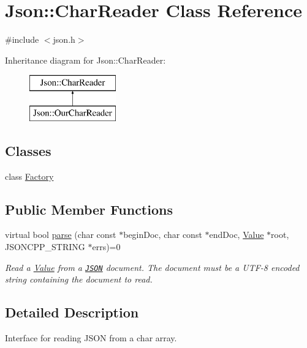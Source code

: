\hypertarget{classJson_1_1CharReader}{}\section{Json\+:\+:Char\+Reader Class Reference}
\label{classJson_1_1CharReader}


{\ttfamily \#include $<$json.\+h$>$}

Inheritance diagram for Json\+:\+:Char\+Reader\+:\begin{figure}[H]
\begin{center}
\leavevmode
\includegraphics[height=2.000000cm]{classJson_1_1CharReader}
\end{center}
\end{figure}
\subsection*{Classes}
\begin{DoxyCompactItemize}
\item 
class \hyperlink{classJson_1_1CharReader_1_1Factory}{Factory}
\end{DoxyCompactItemize}
\subsection*{Public Member Functions}
\begin{DoxyCompactItemize}
\item 
virtual bool \hyperlink{classJson_1_1CharReader_a7983680d50fd0745f371c43b162e78e1}{parse} (char const $\ast$begin\+Doc, char const $\ast$end\+Doc, \hyperlink{classJson_1_1Value}{Value} $\ast$root, J\+S\+O\+N\+C\+P\+P\+\_\+\+S\+T\+R\+I\+NG $\ast$errs)=0
\begin{DoxyCompactList}\small\item\em Read a \hyperlink{classJson_1_1Value}{Value} from a \href{http://www.json.org}{\tt J\+S\+ON} document. The document must be a U\+T\+F-\/8 encoded string containing the document to read. \end{DoxyCompactList}\end{DoxyCompactItemize}


\subsection{Detailed Description}
Interface for reading J\+S\+ON from a char array. 

